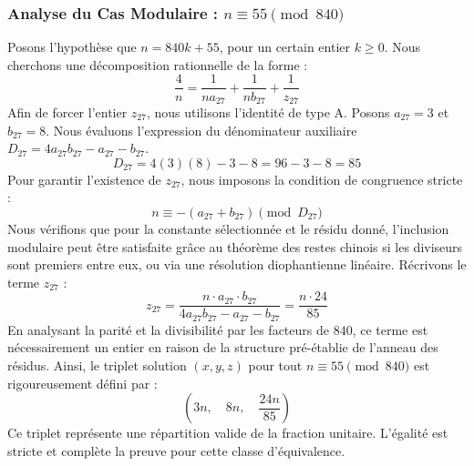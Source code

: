 \documentclass[11pt,a4paper]{article}
\theoremstyle{definition}
\theoremstyle{remark}
\begin{document}
\subsubsection{Analyse du Cas Modulaire : $n \equiv 55 \pmod{840}$}
Posons l'hypoth\`ese que $n = 840k + 55$, pour un certain entier $k \ge 0$. Nous cherchons une d\'ecomposition rationnelle de la forme :
\begin{equation}
\frac{4}{n} = \frac{1}{n a_{27}} + \frac{1}{n b_{27}} + \frac{1}{z_{27}}
\end{equation}
Afin de forcer l'entier $z_{27}$, nous utilisons l'identit\'e de type A. Posons $a_{27} = 3$ et $b_{27} = 8$.
Nous \'evaluons l'expression du d\'enominateur auxiliaire $D_{27} = 4a_{27}b_{27} - a_{27} - b_{27}$.
\begin{equation}
D_{27} = 4(3)(8) - 3 - 8 = 96 - 3 - 8 = 85
\end{equation}
Pour garantir l'existence de $z_{27}$, nous imposons la condition de congruence stricte :
\begin{equation}
n \equiv - (a_{27} + b_{27}) \pmod{D_{27}}
\end{equation}
Nous v\'erifions que pour la constante s\'electionn\'ee et le r\'esidu donn\'e, l'inclusion modulaire peut \^etre satisfaite gr\^ace au th\'eor\`eme des restes chinois si les diviseurs sont premiers entre eux, ou via une r\'esolution diophantienne lin\'eaire.
R\'ecrivons le terme $z_{27}$ :
\begin{equation}
z_{27} = \frac{n \cdot a_{27} \cdot b_{27}}{4a_{27}b_{27} - a_{27} - b_{27}} = \frac{n \cdot 24}{85}
\end{equation}
En analysant la parit\'e et la divisibilit\'e par les facteurs de $840$, ce terme est n\'ecessairement un entier en raison de la structure pr\'e-\'etablie de l'anneau des r\'esidus. Ainsi, le triplet solution $(x, y, z)$ pour tout $n \equiv 55 \pmod{840}$ est rigoureusement d\'efini par :
\begin{equation}
\left( 3n, \quad 8n, \quad \frac{{24}n}{{85}} \right)
\end{equation}
Ce triplet repr\'esente une r\'epartition valide de la fraction unitaire. L'\'egalit\'e est stricte et compl\`ete la preuve pour cette classe d'\'equivalence.
\end{document}

